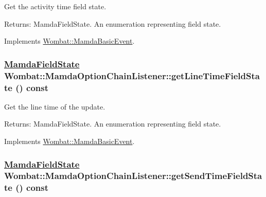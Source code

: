 Get the activity time field state. 

\begin{Desc}
\item[Returns:]Mamda\-Field\-State. An enumeration representing field state. \end{Desc}


Implements \hyperlink{classWombat_1_1MamdaBasicEvent_a61a566e3442181ca1fadc4524296cd0}{Wombat::Mamda\-Basic\-Event}.\hypertarget{classWombat_1_1MamdaOptionChainListener_659564bc5b35a81418fa01d1c4982ad5}{
\subsubsection[getLineTimeFieldState]{\setlength{\rightskip}{0pt plus 5cm}\hyperlink{namespaceWombat_93aac974f2ab713554fd12a1fa3b7d2a}{Mamda\-Field\-State} Wombat::Mamda\-Option\-Chain\-Listener::get\-Line\-Time\-Field\-State () const}}
\label{classWombat_1_1MamdaOptionChainListener_659564bc5b35a81418fa01d1c4982ad5}


Get the line time of the update. 

\begin{Desc}
\item[Returns:]Mamda\-Field\-State. An enumeration representing field state. \end{Desc}


Implements \hyperlink{classWombat_1_1MamdaBasicEvent_eb06352aca3280c5e89bad7a3b185cdf}{Wombat::Mamda\-Basic\-Event}.\hypertarget{classWombat_1_1MamdaOptionChainListener_6034b14704cebdcddf147a4cf9316637}{
\subsubsection[getSendTimeFieldState]{\setlength{\rightskip}{0pt plus 5cm}\hyperlink{namespaceWombat_93aac974f2ab713554fd12a1fa3b7d2a}{Mamda\-Field\-State} Wombat::Mamda\-Option\-Chain\-Listener::get\-Send\-Time\-Field\-State () const}}
\label{classWombat_1_1MamdaOptionChainListener_6034b14704cebdcddf147a4cf9316637}


